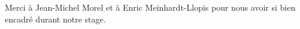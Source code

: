 Merci à Jean-Michel Morel et à Enric Meinhardt-Llopis pour nous avoir si bien encadré durant notre stage.
